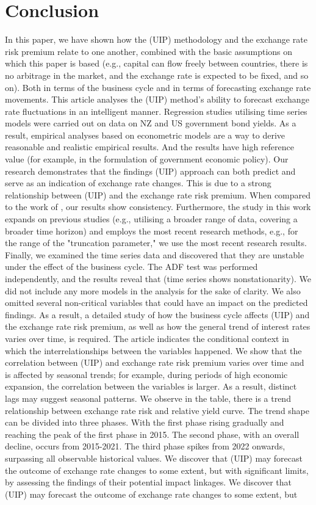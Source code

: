 \documentclass[10pt]{article}
\begin{document}
\section{Conclusion}
In this paper, we have shown how the (UIP) methodology and the exchange rate risk premium relate to one another, combined with the basic assumptions on which this paper is based (e.g., capital can flow freely between countries, there is no arbitrage in the market, and the exchange rate is expected to be fixed, and so on). Both in terms of the business cycle and in terms of forecasting exchange rate movements. This article analyses the (UIP) method's ability to forecast exchange rate fluctuations in an intelligent manner. Regression studies utilising time series models were carried out on data on NZ and US government bond yields. As a result, empirical analyses based on econometric models are a way to derive reasonable and realistic empirical results. And the results have high reference value (for example, in the formulation of government economic policy). Our research demonstrates that the findings (UIP) approach can both predict and serve as an indication of exchange rate changes. This is due to a strong relationship between (UIP) and the exchange rate risk premium. When compared to the work of \cite{chen2013does}, our results show consistency. Furthermore, the study in this work expands on previous studies (e.g., utilising a broader range of data, covering a broader time horizon) and employs the most recent research methods, e.g., for the range of the "truncation parameter," we use the most recent research results. Finally, we examined the time series data and discovered that they are unstable under the effect of the business cycle. The ADF test was performed independently, and the results reveal that (time series shows nonstationarity). We did not include any more models in the analysis for the sake of clarity. We also omitted several non-critical variables that could have an impact on the predicted findings. As a result, a detailed study of how the business cycle affects (UIP) and the exchange rate risk premium, as well as how the general trend of interest rates varies over time, is required. The article indicates the conditional context in which the interrelationships between the variables happened. We show that the correlation between (UIP) and exchange rate risk premium varies over time and is affected by seasonal trends; for example, during periods of high economic expansion, the correlation between the variables is larger. As a result, distinct lags may suggest seasonal patterns. We observe in the table, there is a trend relationship between exchange rate risk and relative yield curve. The trend shape can be divided into three phases. With the first phase rising gradually and reaching the peak of the first phase in 2015. The second phase, with an overall decline, occurs from 2015-2021. The third phase spikes from 2022 onwards, surpassing all observable historical values. We discover that (UIP) may forecast the outcome of exchange rate changes to some extent, but with significant limits, by assessing the findings of their potential impact linkages. We discover that (UIP) may forecast the outcome of exchange rate changes to some extent, but 
\end{document}
